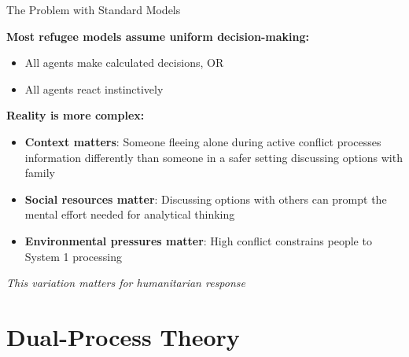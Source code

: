 \documentclass[aspectratio=169]{beamer}
\begin{document}
\begin{frame}{The Problem with Standard Models}

\textbf{Most refugee models assume uniform decision-making:}

\begin{itemize}
    \item All agents make calculated decisions, OR
    \item All agents react instinctively
\end{itemize}

\vspace{1em}

\textbf{Reality is more complex:}

\begin{itemize}
    \item \textbf{Context matters}: Someone fleeing alone during active conflict processes information differently than someone in a safer setting discussing options with family
    \item \textbf{Social resources matter}: Discussing options with others can prompt the mental effort needed for analytical thinking
    \item \textbf{Environmental pressures matter}: High conflict constrains people to System 1 processing
\end{itemize}

\vspace{1em}

\centering
\textit{This variation matters for humanitarian response}

\end{frame}

\section{Dual-Process Theory}
\end{document}
